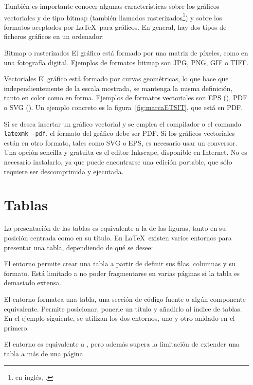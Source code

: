 También es importante conocer algunas características sobre los gráficos vectoriales y de tipo bitmap (también llamados rasterizados\footnote{en inglés, .}) y sobre los formatos aceptados por \LaTeX\ para gráficos. En general, hay dos tipos de ficheros gráficos en un ordenador:

\begin{descript}
	\item[Bitmap o rasterizados] El gráfico está formado por una matriz de píxeles, como en una fotografía digital.
	Ejemplos de formatos bitmap son JPG, PNG, GIF o TIFF.

	\item[Vectoriales] El gráfico está formado por curvas geométricas, lo que hace que independientemente de la escala mostrada, se mantenga la misma definición, tanto en color como en forma.
	Ejemplos de formatos vectoriales son EPS (), PDF o SVG ().
	Un ejemplo concreto es la figura~\ref{fig:marcaETSIT}, que está en PDF.
\end{descript}

	Si se desea insertar un gráfico vectorial y se emplea el compilador  o el comando \texttt{latexmk -pdf}, el formato del gráfico debe ser PDF.
	Si los gráficos vectoriales están en otro formato, tales como SVG o EPS, es necesario usar un conversor.
	Una opción sencilla y gratuita es el editor Inkscape\R, disponible en Internet. No es necesario instalarlo, ya que puede encontrarse una edición portable, que sólo requiere ser descomprimida y ejecutada.

\section{Tablas}
	La presentación de las tablas es equivalente a la de las figuras, tanto en su posición centrada como en su título. En \LaTeX\ existen varios entornos para presentar una tabla, dependiendo de qué se desee:

	\begin{ite}
		\item El entorno  permite crear una tabla a partir de definir sus filas, columnas y su formato.
		Está limitado a no poder fragmentarse en varias páginas si la tabla es demasiado extensa.

		\item El entorno  formatea una tabla, una sección de código fuente o algún componente equivalente.
		Permite posicionar, ponerle un título y añadirlo al índice de tablas. En el ejemplo siguiente, se utilizan los dos entornos, uno  y otro  anidado en el primero.

		\item El entorno  es equivalente a , pero además supera la limitación de extender una tabla a más de una página.
	\end{ite}

